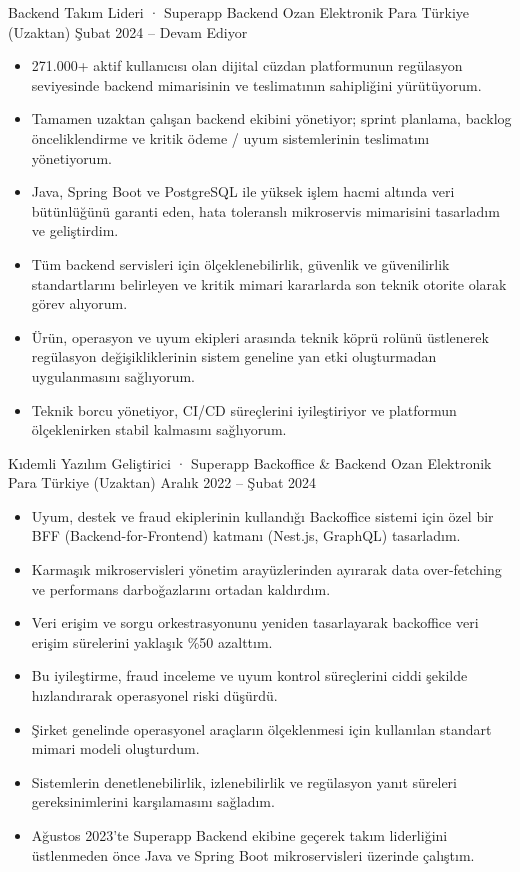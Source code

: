 \resumeSubheading
  {Backend Takım Lideri · Superapp Backend}
  {Ozan Elektronik Para}
  {Türkiye (Uzaktan)}
  {Şubat 2024 -- Devam Ediyor}
\begin{itemize}
  \item 271.000+ aktif kullanıcısı olan dijital cüzdan platformunun regülasyon seviyesinde backend mimarisinin ve teslimatının sahipliğini yürütüyorum.
  \item Tamamen uzaktan çalışan backend ekibini yönetiyor; sprint planlama, backlog önceliklendirme ve kritik ödeme / uyum sistemlerinin teslimatını yönetiyorum.
  \item Java, Spring Boot ve PostgreSQL ile yüksek işlem hacmi altında veri bütünlüğünü garanti eden, hata toleranslı mikroservis mimarisini tasarladım ve geliştirdim.
  \item Tüm backend servisleri için ölçeklenebilirlik, güvenlik ve güvenilirlik standartlarını belirleyen ve kritik mimari kararlarda son teknik otorite olarak görev alıyorum.
  \item Ürün, operasyon ve uyum ekipleri arasında teknik köprü rolünü üstlenerek regülasyon değişikliklerinin sistem geneline yan etki oluşturmadan uygulanmasını sağlıyorum.
  \item Teknik borcu yönetiyor, CI/CD süreçlerini iyileştiriyor ve platformun ölçeklenirken stabil kalmasını sağlıyorum.
\end{itemize}
\vspace{0.3em}

\resumeSubheading
  {Kıdemli Yazılım Geliştirici · Superapp Backoffice \& Backend}
  {Ozan Elektronik Para}
  {Türkiye (Uzaktan)}
  {Aralık 2022 -- Şubat 2024}
\begin{itemize}
  \item Uyum, destek ve fraud ekiplerinin kullandığı Backoffice sistemi için özel bir BFF (Backend-for-Frontend) katmanı (Nest.js, GraphQL) tasarladım.
  \item Karmaşık mikroservisleri yönetim arayüzlerinden ayırarak data over-fetching ve performans darboğazlarını ortadan kaldırdım.
  \item Veri erişim ve sorgu orkestrasyonunu yeniden tasarlayarak backoffice veri erişim sürelerini yaklaşık \%50 azalttım.
  \item Bu iyileştirme, fraud inceleme ve uyum kontrol süreçlerini ciddi şekilde hızlandırarak operasyonel riski düşürdü.
  \item Şirket genelinde operasyonel araçların ölçeklenmesi için kullanılan standart mimari modeli oluşturdum.
  \item Sistemlerin denetlenebilirlik, izlenebilirlik ve regülasyon yanıt süreleri gereksinimlerini karşılamasını sağladım.
  \item Ağustos 2023'te Superapp Backend ekibine geçerek takım liderliğini üstlenmeden önce Java ve Spring Boot mikroservisleri üzerinde çalıştım.
\end{itemize}
\vspace{0.3em}

